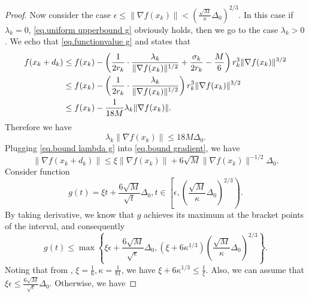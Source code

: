\begin{proof}
Now consider the case $\epsilon \leq \|\nabla f(x_k)\| <\left (\frac{\sqrt{M}}{\kappa}\Delta_0\right)^{2/3}$. In this case if $\lambda_k=0$, \eqref{eq.uniform upperbound g} obviously holds, then we go to the case $\lambda_k>0$. We echo that \eqref{eq.functionvalue g} and  states that 
        \begin{equation*}
        \begin{aligned}
            f(x_k+d_k) &\leq f(x_k) - \left(\frac{1}{2r_k} \cdot \frac{\lambda_k}{\|\nabla f(x_k)\|^{1/2}} + \frac{\sigma_k}{2r_k} - \frac{M}{6}\right)r_k^3\|\nabla f(x_k)\|^{3/2}\\
            &\leq f(x_k)-\left(\frac{1}{2r_k} \cdot \frac{\lambda_k}{\|\nabla f(x_k)\|^{1/2}}\right) r_k^3 \|\nabla f(x_k)\|^{3/2}\\
            &\leq f(x_k)-\frac{1}{18M} \lambda_k \|\nabla f(x_k)\|.
            \end{aligned}
        \end{equation*}
        Therefore we have
        \begin{equation}
            \label{eq.bound lambda g}
            \lambda_k \|\nabla f(x_k)\| \leq 18M\Delta_0.
        \end{equation}
        Plugging \eqref{eq.bound lambda g} into \eqref{eq.bound gradient}, we have
        \begin{equation}
            \label{eq.bound gradient case 2}
            \|\nabla f(x_k+d_k)\| \leq \xi \|\nabla f(x_k)\| +6\sqrt{M}\|\nabla f(x_k)\|^{-1/2}\Delta_0.
        \end{equation}
        Consider function
        \begin{equation*}
            g(t) = \xi t +\frac{6\sqrt{M}}{\sqrt{t}}\Delta_0, t\in \left [\epsilon,\left (\frac{\sqrt{M}}{\kappa}\Delta_0\right)^{2/3}\right ).
        \end{equation*}
        By taking derivative, we know that $g$ achieves its maximum at the bracket points of the interval, and consequently
        \begin{equation*}
            g(t) \leq \max\left\{\xi \epsilon +\frac{6\sqrt{M}}{\sqrt{\epsilon}}\Delta_0,(\xi+6\kappa^{1/3})\left (\frac{\sqrt{M}}{\kappa}\Delta_0\right)^{2/3}\right\}.
        \end{equation*}
        Noting that from  , $\xi = \frac{1}{6}, \kappa = \frac{1}{81}$, we have $\xi+6\kappa^{1/3} \leq \frac{1}{\xi}$. Also, we can assume that $\xi \epsilon \leq \frac{6\sqrt{M}}{\sqrt{\epsilon}}\Delta_0$. Otherwise, we have

\end{proof}

